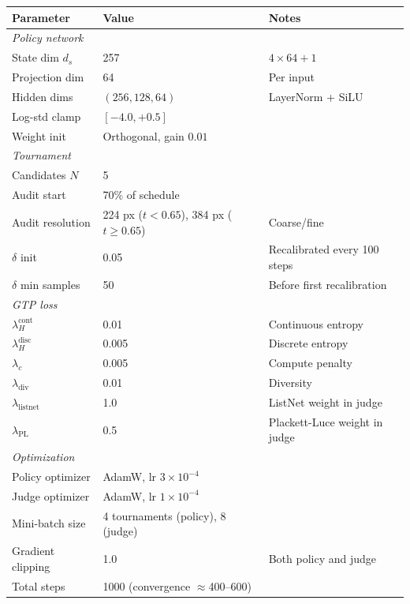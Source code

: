 \begin{table}[h]
\centering
\small
\setlength{\tabcolsep}{4pt}
\begin{tabular}{lll}
\toprule
\textbf{Parameter} & \textbf{Value} & \textbf{Notes} \\
\midrule
\multicolumn{3}{l}{\textit{Policy network}} \\
State dim $d_s$   & 257 & $4 \times 64 + 1$ \\
Projection dim    & 64  & Per input \\
Hidden dims       & $(256, 128, 64)$ & LayerNorm + SiLU \\
Log-std clamp     & $[-4.0, +0.5]$ & \\
Weight init       & Orthogonal, gain $0.01$ & \\
\midrule
\multicolumn{3}{l}{\textit{Tournament}} \\
Candidates $N$    & 5   & \\
Audit start       & 70\% of schedule & \\
Audit resolution  & 224 px ($t < 0.65$), 384 px ($t \geq 0.65$) & Coarse/fine \\
$\delta$ init     & 0.05 & Recalibrated every 100 steps \\
$\delta$ min samples & 50 & Before first recalibration \\
\midrule
\multicolumn{3}{l}{\textit{GTP loss}} \\
$\lambda_H^\text{cont}$ & 0.01 & Continuous entropy \\
$\lambda_H^\text{disc}$ & 0.005 & Discrete entropy \\
$\lambda_c$             & 0.005 & Compute penalty \\
$\lambda_\text{div}$    & 0.01 & Diversity \\
$\lambda_\text{listnet}$& 1.0  & ListNet weight in judge \\
$\lambda_\text{PL}$     & 0.5  & Plackett-Luce weight in judge \\
\midrule
\multicolumn{3}{l}{\textit{Optimization}} \\
Policy optimizer  & AdamW, lr $3\!\times\!10^{-4}$ & \\
Judge optimizer   & AdamW, lr $1\!\times\!10^{-4}$ & \\
Mini-batch size   & 4 tournaments (policy), 8 (judge) & \\
Gradient clipping & 1.0 & Both policy and judge \\
Total steps       & 1000 (convergence $\approx$400--600) & \\

\end{tabular}
\end{table}
